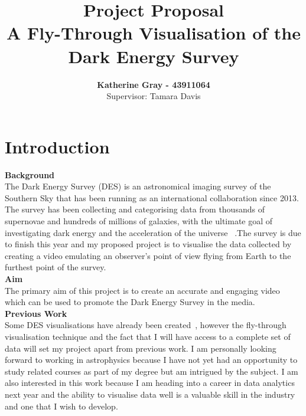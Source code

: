 \documentclass[pra, reprint, A4 paper, bibnotes]{revtex4-1}
\begin{document}
\title{Project Proposal\\A Fly-Through Visualisation of the Dark Energy Survey}
\author{\textbf{Katherine Gray - 43911064}\\ Supervisor: Tamara Davis}

\maketitle %

\thispagestyle{fancy} %
\section{Introduction}
\textbf{Background}\\
The Dark Energy Survey (DES) is an astronomical imaging survey of the Southern Sky that has been running as an international collaboration since 2013. The survey has been collecting and categorising data from thousands of supernovae and hundreds of millions of galaxies, with the ultimate goal of investigating dark energy and the acceleration of the universe ~\cite{dark_energy_survey_collaboration_dark_2016}.The survey is due to finish this year and my proposed project is to visualise the data collected by creating a video emulating an observer's point of view flying from Earth to the furthest point of the survey. \\

\textbf{Aim}\\
The primary aim of this project is to create an accurate and engaging video which can be used to promote the Dark Energy Survey in the media.\\

\textbf{Previous Work}\\
Some DES visualisations have already been created~\cite{samuel_hinton_+ozdes+sdss_2017, ralf_kaehler_year_2017}, however the fly-through visualisation technique and the fact that I will have access to a complete set of data will set my project apart from previous work. I am personally looking forward to working in astrophysics because I have not yet had an opportunity to study related courses as part of my degree but am intrigued by the subject. I am also interested in this work because I am heading into a career in data analytics next year and the ability to visualise data well is a valuable skill in the industry and one that I wish to develop. 
\end{document}
